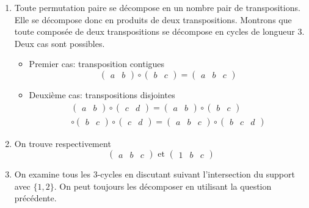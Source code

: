 \begin{enumerate}
 \item Toute permutation paire se décompose en un nombre pair de transpositions. Elle se décompose donc en produits de deux transpositions. Montrons que toute composée de deux transpositions se décompose en cycles de longueur $3$. Deux cas sont possibles.
\begin{itemize}
 \item Premier cas: transposition contigues
\begin{displaymath}
 \begin{pmatrix}
  a&b
 \end{pmatrix}
\circ
 \begin{pmatrix}
  b&c
 \end{pmatrix}
=
 \begin{pmatrix}
  a&b&c
 \end{pmatrix}
\end{displaymath}
\item Deuxième cas: transpositions disjointes
\begin{multline*}
 \begin{pmatrix}
  a&b
 \end{pmatrix}
\circ
 \begin{pmatrix}
  c&d
 \end{pmatrix}
=
 \begin{pmatrix}
  a&b
 \end{pmatrix}
\circ
 \begin{pmatrix}
  b&c
 \end{pmatrix} \\
\circ
 \begin{pmatrix}
  b&c
 \end{pmatrix}
\circ
 \begin{pmatrix}
  c&d
 \end{pmatrix}
=
 \begin{pmatrix}
  a&b&c
 \end{pmatrix} 
\circ
 \begin{pmatrix}
  b&c&d
  \end{pmatrix}
\end{multline*}

\end{itemize}
\item On trouve respectivement
\begin{displaymath}
 \begin{pmatrix}
  a&b&c
 \end{pmatrix} 
\text{ et }
 \begin{pmatrix}
  1&b&c
 \end{pmatrix} 
\end{displaymath}

\item On examine tous les 3-cycles en discutant suivant l'intersection du support avec $\{1,2\}$. On peut toujours les décomposer en utilisant la question précédente.

\end{enumerate}
